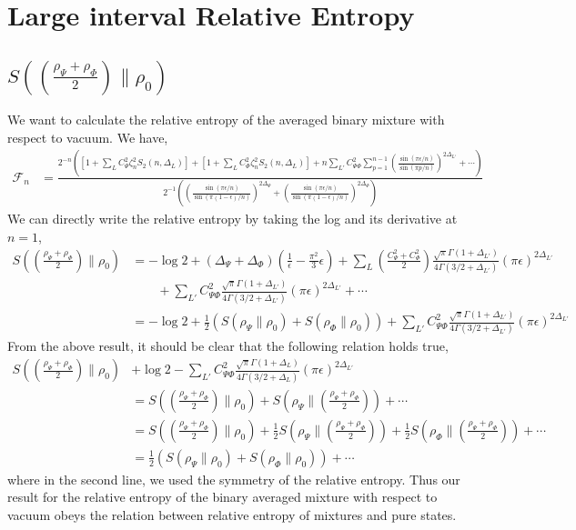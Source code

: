 \documentclass[11pt]{article}
\newcommand{\ep}{\epsilon}
\newcommand{\nn}{\nonumber}
\newcommand{\lb}{\left(}
\newcommand{\rb}{\right)}
\begin{document}
\section{Large interval Relative Entropy}
\subsection{\texorpdfstring{$S\lb \lb\frac{\rho_\Psi + \rho_\Phi}{2}\rb\big\| \rho_0\rb$}{S averaged binary mixture wrt vacuum}}
We want to calculate the relative entropy of the averaged binary mixture with respect to vacuum. We have,
\begin{align}
    \mathcal{F}_n &= \frac{2^{-n} \lb  [1+ \sum_LC_{\Psi}^2\zeta_n^2 S_2(n,\Delta_L)] +[1+ \sum_LC_{\Phi}^2\zeta_n^2 S_2(n,\Delta_L)]  + n\sum_{L'}C_{\Psi\Phi}^2\sum_{p=1}^{n-1}\lb\frac{\sin (\pi \ep/n)}{\sin (\pi p/n)}\rb^{2\Delta_{L'}}+  \cdots\rb}{2^{-1}\lb \lb\frac{\sin (\pi \ep/n)}{\sin (\pi (1-\ep)/n)}\rb^{2\Delta_{\Psi}}+\lb\frac{\sin (\pi \ep/n)}{\sin (\pi (1-\ep)/n)}\rb^{2\Delta_{\Phi}} \rb}
\end{align}
We can directly write the relative entropy by taking the log and its derivative at $n=1$,
\begin{align}
    S\lb \lb\frac{\rho_\Psi + \rho_\Phi}{2}\rb\Big\| \rho_0\rb &= -\log 2+ \lb\Delta_\Psi + \Delta_\Phi\rb \lb\frac{1}{\ep} - \frac{\pi^2}{3}\ep \rb + \sum_L\lb\frac{C_{\Psi}^2 + C_\Phi^2}{2} \rb \frac{\sqrt{\pi }\Gamma(1+\Delta_{L'})}{4\Gamma(3/2+\Delta_{L'})}(\pi \ep)^{2\Delta_{L'}} \nn\\
    &\qquad + \sum_{L'}C_{\Psi\Phi}^2\frac{\sqrt{\pi }\Gamma(1+\Delta_{L'})}{4\Gamma(3/2+\Delta_{L'})}(\pi \ep)^{2\Delta_{L'}} +\cdots\\
    &= -\log 2 + \frac{1}{2}\lb S(\rho_\Psi \| \rho_0) + S(\rho_\Phi \| \rho_0) \rb + \sum_{L'}C_{\Psi\Phi}^2\frac{\sqrt{\pi }\Gamma(1+\Delta_{L'})}{4\Gamma(3/2+\Delta_{L'})}(\pi \ep)^{2\Delta_{L'}}
\end{align}
From the above result, it should be clear that the following relation holds true,
\begin{align}
    S\lb \lb\frac{\rho_\Psi + \rho_\Phi}{2}\rb\Big\| \rho_0\rb &+ \log 2 - \sum_{L'}C_{\Psi\Phi}^2\frac{\sqrt{\pi }\Gamma(1+\Delta_L)}{4\Gamma(3/2+\Delta_L)}(\pi \ep)^{2\Delta_{L'}}\\
    &= S\lb \lb\frac{\rho_\Psi + \rho_\Phi}{2}\rb\Big\| \rho_0\rb + S\lb\rho_\Psi \Big\| \lb\frac{\rho_\Psi + \rho_\Phi}{2}\rb\rb + \cdots\\
     &=S\lb \lb\frac{\rho_\Psi + \rho_\Phi}{2}\rb\Big\| \rho_0\rb + \frac{1}{2}S\lb\rho_\Psi \Big\| \lb\frac{\rho_\Psi + \rho_\Phi}{2}\rb\rb + \frac{1}{2}S\lb\rho_\Phi \Big\| \lb\frac{\rho_\Psi + \rho_\Phi}{2}\rb\rb+\cdots \\ 
     &= 
     \frac{1}{2}\lb S(\rho_\Psi \| \rho_0) + S(\rho_\Phi \| \rho_0) \rb + \cdots
\end{align}
where in the second line, we used the symmetry of the relative entropy.
Thus our result for the relative entropy of the binary averaged mixture with respect to vacuum obeys the relation between relative entropy of mixtures and pure states.
\end{document}
